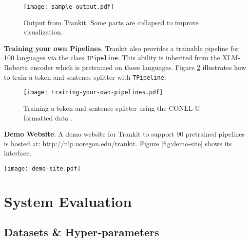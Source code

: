 \documentclass[11pt,a4paper]{article}
\begin{document}
\begin{figure}[ht]
    \centering
    \texttt{[image: sample-output.pdf]}
    \caption{Output from Trankit. Some parts are collapsed to improve visualization.}
    \label{fig:output}
\end{figure}











\vspace{0.3cm}

\noindent \textbf{Training your own Pipelines}. Trankit also provides a trainable pipeline for 100 languages via the class \texttt{TPipeline}. This ability is inherited from the XLM-Roberta encoder which is pretrained on those languages. Figure \ref{fig:train} illustrates how to train a token and sentence splitter with \texttt{TPipeline}.

\begin{figure}[ht]
    \centering
    \texttt{[image: training-your-own-pipelines.pdf]}
    \caption{Training a token and sentence splitter using the CONLL-U formatted data \cite{nivre-etal-2020-universal}.}
    \label{fig:train}
\end{figure}




\vspace{0.3cm}

\noindent \textbf{Demo Website}. A demo website for Trankit to support 90 pretrained pipelines is hosted at: \url{http://nlp.uoregon.edu/trankit}. Figure \ref{fig:demo-site} shows its interface.

\begin{figure*}[ht]
    \centering
    \texttt{[image: demo-site.pdf]}
    \caption{Demo website for Trankit.}
\label{fig:demo-site}
\end{figure*}

\section{System Evaluation}
\label{sec:exp}


\subsection{Datasets \& Hyper-parameters}
\end{document}
